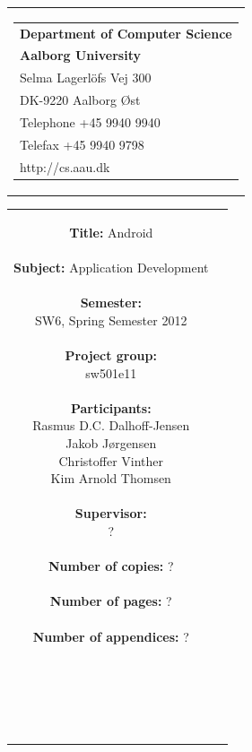 \begin{nopagebreak}
\samepage 
\begin{tabular}{r}
\parbox{\textwidth}{
\hfill \parbox{6.2cm}{\begin{tabular}{l}
{\textsf\small \textbf{Department of Computer Science }}\\
{\textsf\small  \textbf{Aalborg University}}\\
{\textsf\small Selma Lagerlöfs Vej 300}\\
{\textsf\small DK-9220 Aalborg Øst}\\
{\textsf\small Telephone +45 9940 9940}\\
{\textsf\small Telefax +45 9940 9798}\\
{\textsf\small http://cs.aau.dk}
\end{tabular}}}
\end{tabular}

\begin{tabular}{cc}
\parbox{7cm}{
\textbf{Title:} 
Android\\ \\
\textbf{Subject:} 
Application Development \\ \\
\textbf{Semester:} \\
SW6, Spring Semester 2012\\ \\
\textbf{Project group:} \\
sw501e11\\ \\
\textbf{Participants:} \\
Rasmus D.C. Dalhoff-Jensen \\
Jakob Jørgensen \\
Christoffer Vinther \\
Kim Arnold Thomsen \\ \\
\textbf{Supervisor:} \\
?\\ \\
\textbf{Number of copies:}
? \\ \\
\textbf{Number of pages:}
? \\ \\
\textbf{Number of appendices:}
? \\ \\
\date{} \\ \\ \\
}


\end{tabular}
\end{nopagebreak}
